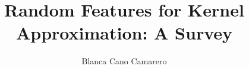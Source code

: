 \title{Random Features for Kernel Approximation: A Survey }
\author{Blanca Cano Camarero}


\relax
{}\relax
{}\relax

\newcommand{\bgcolor}{blue}